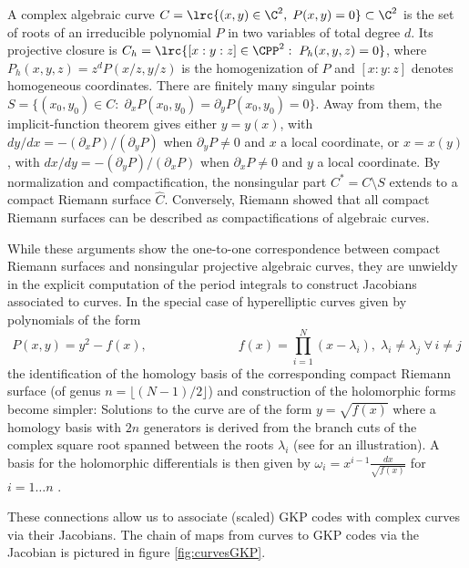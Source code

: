 \documentclass[a4paper, aps, pra, 11pt, onecolumn, tightenlines, superscriptaddress]{revtex4-2}
\begin{document}
A complex algebraic curve $C=\lrc{(x,y)\in \C^2,\; P(x,y)=0 }\subset \C^2$ is the set of roots of an irreducible polynomial $P$ in two variables of total degree $d$. Its projective closure is $C_h=\lrc{[x:y:z]\in\CPP^2:\;P_h(x,y,z)=0}$, where $P_h(x,y,z)=z^dP(x/z,y/z)$ is the homogenization of $P$ and $[x:y:z]$ denotes homogeneous coordinates. There are finitely many singular points $S=\{(x_0, y_0)\in C:\; \partial_{x}P(x_0, y_0)=\partial_{y}P(x_0, y_0)=0 \}$. Away from them, the implicit-function theorem gives either $y=y(x)$, with $dy/dx=-(\partial_xP)/(\partial_yP)$ when $\partial_yP\neq0$ and $x$ a local coordinate, or $x=x(y)$, with $dx/dy=-(\partial_yP)/(\partial_xP)$ when $\partial_xP\neq0$ and $y$ a local coordinate.
By normalization and compactification, the nonsingular part $C^*=C\setminus S$ extends to a compact Riemann surface $\widehat C$\cite{Griffiths1989}. %
Conversely, Riemann showed that all compact Riemann surfaces can be described as compactifications of algebraic curves.

While these arguments show the one-to-one correspondence between compact Riemann surfaces and nonsingular projective algebraic curves, they are unwieldy in the explicit computation of the period integrals to construct Jacobians associated to curves. In the special case of hyperelliptic curves given by polynomials of the form
\begin{equation}
    P(x, y)=y^2-f(x),\hspace{3cm} f(x)=\prod_{i=1}^N (x-\lambda_i),\; \lambda_i\neq \lambda_j\; \forall\, i\neq j
\end{equation}
the identification of the homology basis of the corresponding compact Riemann surface (of genus $n=\lfloor (N-1)/2\rfloor$) and construction of the holomorphic forms become simpler:
Solutions to the curve are of the form $y=\sqrt{f(x)}$
where a homology basis with $2n$ generators is derived from the branch cuts of the complex square root spanned between the roots $\lambda_i$ (see \cite[p. 160]{Silverman2009} for an illustration). 
A basis for the holomorphic differentials is then given by
$\omega_i=x^{i-1}\frac{dx}{\sqrt{f(x)}}$ for $i=1\hdots n$ \cite{Birkenhake_2004}.


These connections allow us to associate (scaled) GKP codes with complex curves via their Jacobians. 
The chain of maps from curves to GKP codes via the Jacobian is pictured in figure \ref{fig:curvesGKP}.
\end{document}
